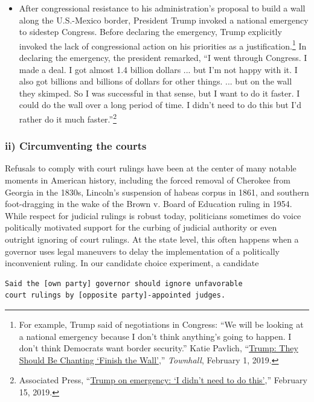 \documentclass[12pt]{article}
\begin{document}
\begin{itemize}
\item After congressional resistance to his administration's proposal to build a wall along the U.S.-Mexico border, President Trump invoked a national emergency to sidestep Congress. Before declaring the emergency, Trump explicitly invoked the lack of congressional action on his priorities as a justification.\footnote{For example, Trump said of negotiations in Congress: ``We will be looking at a national emergency because I don't think anything's going to happen. I don't think Democrats want border security.'' Katie Pavlich, ``\href{https://townhall.com/tipsheet/katiepavlich/2019/02/01/trump-they-should-be-chanting-finish-the-wall-n2540669}{Trump: They Should Be Chanting `Finish the Wall'},'' \emph{Townhall}, February 1, 2019.} In declaring the emergency, the president remarked, ``I went through Congress. I made a deal. I got almost 1.4 billion dollars ... but I'm not happy with it. I also got billions and billions of dollars for other things. ... but on the wall they skimped. So I was successful in that sense, but I want to do it faster. I could do the wall over a long period of time. I didn't need to do this but I'd rather do it much faster.''\footnote{Associated Press, ``\href{https://www.youtube.com/watch?v=13aXelWfccw}{Trump on emergency: `I didn't need to do this'},'' February 15, 2019.}

\end{itemize}

\subsubsection*{ii) Circumventing the courts}

Refusals to comply with court rulings have been at the center of many notable moments in American history, including the forced removal of Cherokee from Georgia in the 1830s, Lincoln's suspension of habeas corpus in 1861, and southern foot-dragging in the wake of the Brown v. Board of Education ruling in 1954. While respect for judicial rulings is robust today, politicians sometimes do voice politically motivated support for the curbing of judicial authority or even outright ignoring of court rulings. At the state level, this often happens when a governor uses legal maneuvers to delay the implementation of a politically inconvenient ruling. In our candidate choice experiment, a candidate
\begin{center}
\begin{varwidth}{\linewidth}
\begin{verbatim}
Said the [own party] governor should ignore unfavorable
court rulings by [opposite party]-appointed judges.
\end{verbatim}
\end{varwidth}
\end{center}
\end{document}
